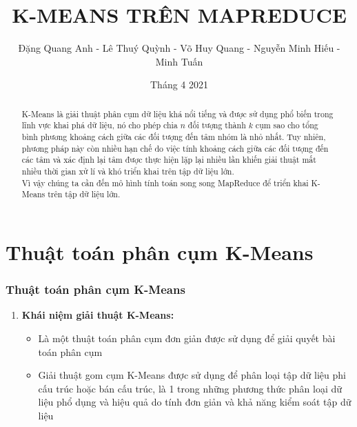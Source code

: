 \documentclass[12pt]{beamer}
\begin{document}
	\author{Đặng Quang Anh - Lê Thuý Quỳnh - Võ Huy Quang - Nguyễn Minh Hiếu - Minh Tuấn}
	\title{K-MEANS TRÊN MAPREDUCE}
	\date{Tháng 4 2021}
	\maketitle
	\begin{abstract}
		K-Means là giải thuật phân cụm dữ liệu khá nổi tiếng và được sử dụng phổ biến trong lĩnh vực khai phá dữ liệu, nó cho phép chia $n$ đối tượng thành $k$ cụm sao cho tổng bình phương khoảng cách giữa các đối tượng đến tâm nhóm là nhỏ nhất. Tuy nhiên, phương pháp này còn nhiều hạn chế do việc tính khoảng cách giữa các đối tượng đến các tâm và xác định lại tâm được thực hiện lặp lại nhiều lần khiến giải thuật mất nhiều thời gian xử lí và khó triển khai trên tập dữ liệu lớn.\\
		Vì vậy chúng ta cần đến mô hình tính toán song song MapReduce để triển khai K-Means trên tập dữ liệu lớn.
	\end{abstract}


	\section{Thuật toán phân cụm K-Means}
	\begin{frame}
		\frametitle{Thuật toán phân cụm K-Means}
		\begin{enumerate} [\textbf{1.}]
			\item \textbf{Khái niệm giải thuật K-Means:}
					\begin{itemize}
						\item Là một thuật toán phân cụm đơn giản được sử dụng để giải quyết bài toán phân cụm
						\item Giải thuật gom cụm K-Means được sử dụng để phân loại tập dữ liệu phi cấu trúc hoặc bán cấu trúc, là 1 trong những phương thức phân loại dữ liệu phổ dụng và hiệu quả do tính đơn giản và khả năng kiểm soát tập dữ liệu
					\end{itemize}
		\end{enumerate}
	\end{frame}
	
\end{document}
